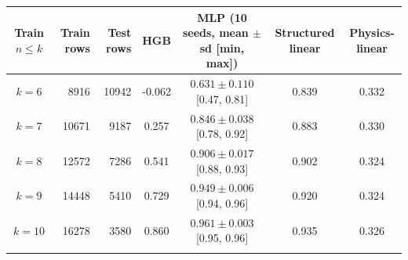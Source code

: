 \begin{tabular}{crrcccc}
\toprule
Train $n\le k$ & Train rows & Test rows & HGB & MLP (10 seeds, mean $\pm$ sd [min, max]) & Structured linear & Physics-linear \\
\midrule
$k=6$ & 8916 & 10942 & -0.062 & $0.631 \pm 0.110$ [0.47, 0.81] & 0.839 & 0.332 \\
$k=7$ & 10671 & 9187 & 0.257 & $0.846 \pm 0.038$ [0.78, 0.92] & 0.883 & 0.330 \\
$k=8$ & 12572 & 7286 & 0.541 & $0.906 \pm 0.017$ [0.88, 0.93] & 0.902 & 0.324 \\
$k=9$ & 14448 & 5410 & 0.729 & $0.949 \pm 0.006$ [0.94, 0.96] & 0.920 & 0.324 \\
$k=10$ & 16278 & 3580 & 0.860 & $0.961 \pm 0.003$ [0.95, 0.96] & 0.935 & 0.326 \\
\botrule
\end{tabular}
